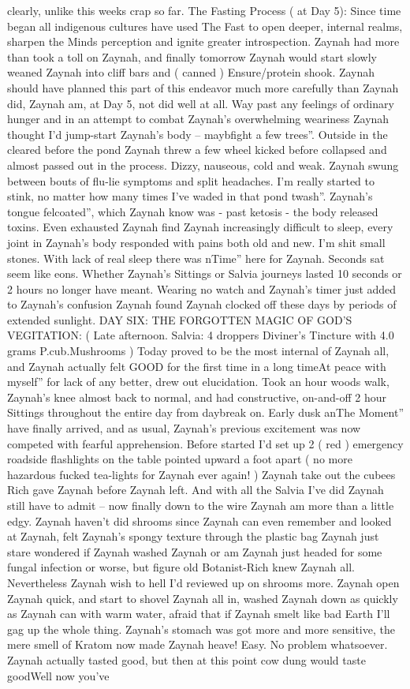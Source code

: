 \documentclass[12pt]{book}
\begin{document}
clearly, unlike this weeks crap so far. The Fasting Process ( at Day 5): Since time began all indigenous cultures have used The Fast to open deeper, internal realms, sharpen the Minds perception and ignite greater introspection. Zaynah had more than took a toll on Zaynah, and finally tomorrow Zaynah would start slowly weaned Zaynah into cliff bars and ( canned ) Ensure/protein shook. Zaynah should have planned this part of this endeavor much more carefully than Zaynah did, Zaynah am, at Day 5, not did well at all. Way past any feelings of ordinary hunger and in an attempt to combat Zaynah's overwhelming weariness Zaynah thought I'd jump-start Zaynah's body -- maybfight a few trees''. Outside in the cleared before the pond Zaynah threw a few wheel kicked before collapsed and almost passed out in the process. Dizzy, nauseous, cold and weak. Zaynah swung between bouts of flu-lie symptoms and split headaches. I'm really started to stink, no matter how many times I've waded in that pond twash''. Zaynah's tongue felcoated'', which Zaynah know was - past ketosis - the body released toxins. Even exhausted Zaynah find Zaynah increasingly difficult to sleep, every joint in Zaynah's body responded with pains both old and new. I'm shit small stones. With lack of real sleep there was nTime'' here for Zaynah. Seconds sat seem like eons. Whether Zaynah's Sittings or Salvia journeys lasted 10 seconds or 2 hours no longer have meant. Wearing no watch and Zaynah's timer just added to Zaynah's confusion Zaynah found Zaynah clocked off these days by periods of extended sunlight. DAY SIX: THE FORGOTTEN MAGIC OF GOD'S VEGITATION: ( Late afternoon. Salvia: 4 droppers Diviner's Tincture with 4.0 grams P.cub.Mushrooms ) Today proved to be the most internal of Zaynah all, and Zaynah actually felt GOOD for the first time in a long timeAt peace with myself'' for lack of any better, drew out elucidation. Took an hour woods walk, Zaynah's knee almost back to normal, and had constructive, on-and-off 2 hour Sittings throughout the entire day from daybreak on. Early dusk anThe Moment'' have finally arrived, and as usual, Zaynah's previous excitement was now competed with fearful apprehension. Before started I'd set up 2 ( red ) emergency roadside flashlights on the table pointed upward a foot apart ( no more hazardous fucked tea-lights for Zaynah ever again! ) Zaynah take out the cubees Rich gave Zaynah before Zaynah left. And with all the Salvia I've did Zaynah still have to admit -- now finally down to the wire Zaynah am more than a little edgy. Zaynah haven't did shrooms since Zaynah can even remember and looked at Zaynah, felt Zaynah's spongy texture through the plastic bag Zaynah just stare wondered if Zaynah washed Zaynah or am Zaynah just headed for some fungal infection or worse, but figure old Botanist-Rich knew Zaynah all. Nevertheless Zaynah wish to hell I'd reviewed up on shrooms more. Zaynah open Zaynah quick, and start to shovel Zaynah all in, washed Zaynah down as quickly as Zaynah can with warm water, afraid that if Zaynah smelt like bad Earth I'll gag up the whole thing. Zaynah's stomach was got more and more sensitive, the mere smell of Kratom now made Zaynah heave! Easy. No problem whatsoever. Zaynah actually tasted good, but then at this point cow dung would taste goodWell now you've 
\end{document}
